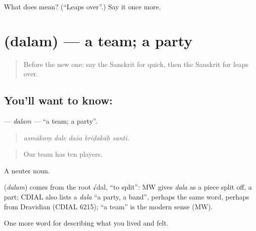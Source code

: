 \begin{tcolorbox}[breakable,colback=teal!4,colframe=teal!35!black,title={Before you move on}]
What does  mean? (\textquotedblleft{}Leaps over\textquotedblright{}.) Say it once more.
\end{tcolorbox}
\section[\texorpdfstring{\sk{दलम्} (dalam)}{दलम् (dalam)}]{ (dalam) — a team; a party}

\label{lesson:SA-C526-dalam}



\begin{quote}
Before the new one: say the Sanskrit for quick, then the Sanskrit for leaps over.
\end{quote}

\subsection*{You'll want to know: }
\textbf{} — \emph{dalam} — \textquotedblleft{}a team; a party\textquotedblright{}.

\begin{quote}
    
\end{quote}

\begin{quote}
\emph{asmākaṃ dale daśa krīḍakāḥ santi.}
\end{quote}

\begin{quote}
Our team has ten players.
\end{quote}

A neuter noun.

\begin{cousinweb}
\textbf{} (\emph{dalam}) comes from the root √dal, \textquotedblleft{}to split\textquotedblright{}: MW gives \emph{dala} as a piece split off, a part; CDIAL also lists a \emph{dala} \textquotedblleft{}a party, a band\textquotedblright{}, perhaps the same word, perhaps from Dravidian (CDIAL 6215); \textquotedblleft{}a team\textquotedblright{} is the modern sense (MW).
\end{cousinweb}

\begin{grammarlens}[title={What you've built}]
One more word for describing what you lived and felt.
\end{grammarlens}

